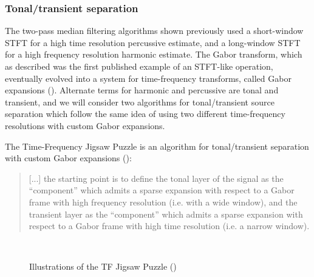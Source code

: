 \documentclass[report.tex]{subfiles}
\begin{document}
\subsubsection{Tonal/transient separation}
\label{sec:custgabor}

The two-pass median filtering algorithms shown previously used a short-window STFT for a high time resolution percussive estimate, and a long-window STFT for a high frequency resolution harmonic estimate. The Gabor transform, which as described was the first published example of an STFT-like operation, eventually evolved into a system for time-frequency transforms, called Gabor expansions (\cite{gaborexpansion}). Alternate terms for harmonic and percussive are tonal and transient, and we will consider two algorithms for tonal/transient source separation which follow the same idea of using two different time-frequency resolutions with custom Gabor expansions.

The Time-Frequency Jigsaw Puzzle is an algorithm for tonal/transient separation with custom Gabor expansions (\cite[6--7]{tfjigsaw}):
\begin{quote}
	[...] the starting point is to define the tonal layer of the signal as the ``component'' which admits a sparse expansion with respect to a Gabor frame with high frequency resolution (i.e. with a wide window), and the transient layer as the ``component'' which admits a sparse expansion with respect to a Gabor frame with high time resolution (i.e. a narrow window).
\end{quote}

\begin{figure}[ht]
	\centering
	\\
	\caption{Illustrations of the TF Jigsaw Puzzle (\cite[3, 4]{tfjigsaw})}
	\label{fig:supertiles}
\end{figure}
\end{document}
